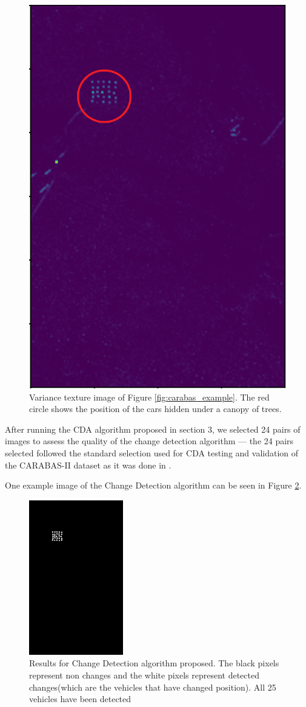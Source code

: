\begin{figure}[H]
  \centering
  \includegraphics[width=0.3\linewidth]{Cap3-Results/variance_exemplo.png}
  \caption{Variance texture image of Figure \ref{fig:carabas_example}.
  The red circle shows the position of the cars hidden under a canopy of trees.}
  \label{fig:variance_example}
\end{figure}

After running the CDA algorithm proposed in section 3, we selected 24 pairs of images to assess the quality of the change detection algorithm --- the 24 pairs selected followed
the standard selection used for CDA testing and validation of
the CARABAS-II dataset as it was done in \cite{Carabas, Ricardo, LucasRamos}.

One example image of the Change Detection algorithm can be seen in Figure \ref{fig:carabas_results}.

\begin{figure}[H]
  \centering
  \includegraphics[width=0.3\linewidth]{Cap3-Results/results_carabas.png}
  \caption{Results for Change Detection algorithm proposed. The black pixels represent non changes and the white pixels represent detected changes(which are the vehicles that have changed position). All 25 vehicles have been detected}
  \label{fig:carabas_results}
\end{figure}

